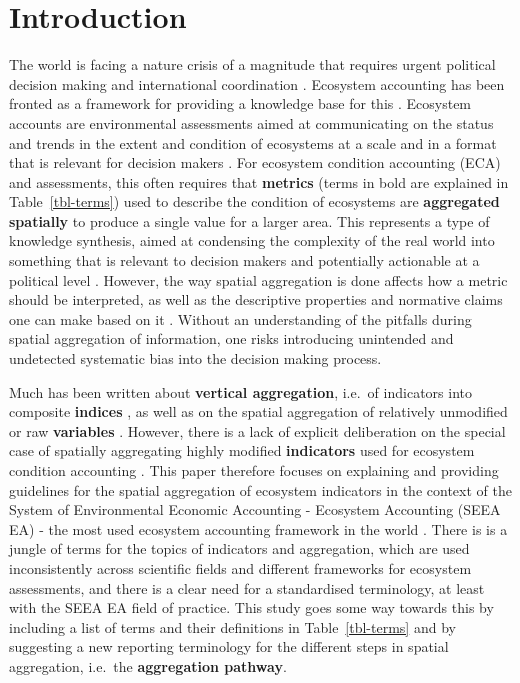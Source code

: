 \documentclass[
  authoryear,
  preprint,
  3p]{elsarticle}
\begin{document}
    

\section{Introduction}\label{introduction}

The world is facing a nature crisis of a magnitude that requires urgent
political decision making and international coordination
\citep{ipbes_global_2019}. Ecosystem accounting has been fronted as a
framework for providing a knowledge base for this
\citep{bagstad_lessons_2021, grondard_ecosystem_2021}. Ecosystem
accounts are environmental assessments aimed at communicating on the
status and trends in the extent and condition of ecosystems at a scale
and in a format that is relevant for decision makers
\citep{edens2022, comte2022}. For ecosystem condition accounting (ECA)
and assessments, this often requires that \textbf{metrics} (terms in
bold are explained in Table~\ref{tbl-terms}) used to describe the
condition of ecosystems are \textbf{aggregated spatially} to produce a
single value for a larger area. This represents a type of knowledge
synthesis, aimed at condensing the complexity of the real world into
something that is relevant to decision makers and potentially actionable
at a political level \citep{king2024}. However, the way spatial
aggregation is done affects how a metric should be interpreted, as well
as the descriptive properties and normative claims one can make based on
it \citep{allain2018}. Without an understanding of the pitfalls during
spatial aggregation of information, one risks introducing unintended and
undetected systematic bias into the decision making process.

Much has been written about \textbf{vertical aggregation}, i.e.~of
indicators into composite \textbf{indices}
\citep[e.g.][]{langhans2014, oecd_2008}, as well as on the spatial
aggregation of relatively unmodified or raw \textbf{variables}
\citep[e.g.][]{allain2018}. However, there is a lack of explicit
deliberation on the special case of spatially aggregating highly
modified \textbf{indicators} used for ecosystem condition accounting
\citep[but see][]{vanbeurden1999}. This paper therefore focuses on
explaining and providing guidelines for the spatial aggregation of
ecosystem indicators in the context of the System of Environmental
Economic Accounting - Ecosystem Accounting (SEEA EA)
\citep{unitednations2024} - the most used ecosystem accounting framework
in the world \citep{comte2022}. There is is a jungle of terms for the
topics of indicators and aggregation, which are used inconsistently
across scientific fields and different frameworks for ecosystem
assessments, and there is a clear need for a standardised terminology,
at least with the SEEA EA field of practice. This study goes some way
towards this by including a list of terms and their definitions in
Table~\ref{tbl-terms} and by suggesting a new reporting terminology for
the different steps in spatial aggregation, i.e.~the \textbf{aggregation
pathway}.
\end{document}
